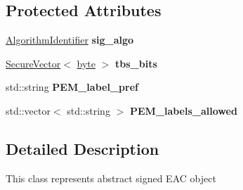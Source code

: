 \subsection*{Protected Attributes}
\begin{DoxyCompactItemize}
\item 
\hypertarget{classBotan_1_1EAC__Signed__Object_a59bcdd644872c91c044e15339cda9a06}{\hyperlink{classBotan_1_1AlgorithmIdentifier}{Algorithm\-Identifier} {\bfseries sig\-\_\-algo}}\label{classBotan_1_1EAC__Signed__Object_a59bcdd644872c91c044e15339cda9a06}

\item 
\hypertarget{classBotan_1_1EAC__Signed__Object_a49fb92b3cb9d6a6bf8156ca5a4ecda27}{\hyperlink{classBotan_1_1SecureVector}{Secure\-Vector}$<$ \hyperlink{namespaceBotan_a7d793989d801281df48c6b19616b8b84}{byte} $>$ {\bfseries tbs\-\_\-bits}}\label{classBotan_1_1EAC__Signed__Object_a49fb92b3cb9d6a6bf8156ca5a4ecda27}

\item 
\hypertarget{classBotan_1_1EAC__Signed__Object_ad9f1bbc6ebfc38f4ecede8bda913f2ac}{std\-::string {\bfseries P\-E\-M\-\_\-label\-\_\-pref}}\label{classBotan_1_1EAC__Signed__Object_ad9f1bbc6ebfc38f4ecede8bda913f2ac}

\item 
\hypertarget{classBotan_1_1EAC__Signed__Object_a103f10043aaa8dcf5c85de6ed27fd8a0}{std\-::vector$<$ std\-::string $>$ {\bfseries P\-E\-M\-\_\-labels\-\_\-allowed}}\label{classBotan_1_1EAC__Signed__Object_a103f10043aaa8dcf5c85de6ed27fd8a0}

\end{DoxyCompactItemize}


\subsection{Detailed Description}
This class represents abstract signed E\-A\-C object 

